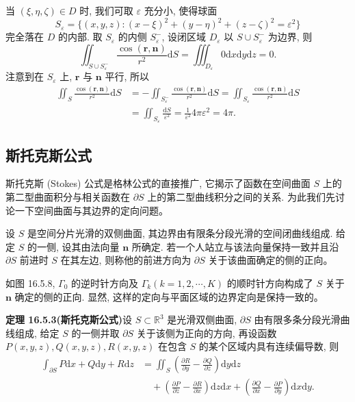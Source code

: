 \documentclass[UTF8, 12pt, fontset=fandol, oneside]{ctexart}
\begin{document}
当 $(\xi,\eta,\zeta)\in D$ 时, 我们可取 $\varepsilon$ 充分小, 使得球面
\[
  S_\varepsilon=\{(x,y,z):(x-\xi)^2+(y-\eta)^2+(z-\zeta)^2=\varepsilon^2\}
\]
完全落在 $D$ 的内部. 取 $S_\varepsilon$ 的内侧 $S_\varepsilon^-$, 设闭区域 $D_\varepsilon$ 以 $S\cup S_\varepsilon^-$ 为边界, 则
\[
  \iint_{S\cup S_\varepsilon^-}\frac{\cos(\boldsymbol r,\boldsymbol n)}{r^2}\mathrm dS
  =\iiint_{D_\varepsilon}0\mathrm dx\mathrm dy\mathrm dz=0.
\]
注意到在 $S_\varepsilon$ 上, $\boldsymbol r$ 与 $\boldsymbol n$ 平行, 所以
\[
\begin{aligned}
  \iint_S\frac{\cos(\boldsymbol r,\boldsymbol n)}{r^2}\mathrm dS
  &=-\iint_{S_\varepsilon^-}\frac{\cos(\boldsymbol r,\boldsymbol n)}{r^2}\mathrm dS
    =\iint_{S_\varepsilon}\frac{\cos(\boldsymbol r,\boldsymbol n)}{r^2}\mathrm dS\\
  &=\iint_{S_\varepsilon}\frac{\mathrm dS}{\varepsilon^2}
    =\frac1{\varepsilon^2}4\pi\varepsilon^2=4\pi.
\end{aligned}
\]

\subsection{斯托克斯公式}

斯托克斯 (Stokes) 公式是格林公式的直接推广, 它揭示了函数在空间曲面 $S$ 上的第二型曲面积分与相关函数在 $\partial S$ 上的第二型曲线积分之间的关系. 为此我们先讨论一下空间曲面与其边界的定向问题。

设 $S$ 是空间分片光滑的双侧曲面, 其边界由有限条分段光滑的空间闭曲线组成. 给定 $S$ 的一侧, 设其由法向量 $\boldsymbol n$ 所确定. 若一个人站立与该法向量保持一致并且沿 $\partial S$ 前进时 $S$ 在其左边, 则称他的前进方向为 $\partial S$ 关于该曲面确定的侧的正向。

如图 16.5.8, $\Gamma_0$ 的逆时针方向及 $\Gamma_k(k=1,2,\cdots,K)$ 的顺时针方向构成了 $S$ 关于 $\boldsymbol n$ 确定的侧的正向. 显然, 这样的定向与平面区域的边界定向是保持一致的。

\noindent\textbf{定理 16.5.3(斯托克斯公式)}\quad 设 $S\subset\mathbb R^3$ 是光滑双侧曲面, $\partial S$ 由有限多条分段光滑曲线组成, 给定 $S$ 的一侧并取 $\partial S$ 关于该侧为正向的方向, 再设函数 $P(x,y,z),Q(x,y,z),R(x,y,z)$ 在包含 $S$ 的某个区域内具有连续偏导数, 则
\[
\begin{aligned}
  \int_{\partial S}P\mathrm dx+Q\mathrm dy+R\mathrm dz
  &=\iint_S\left(\frac{\partial R}{\partial y}-\frac{\partial Q}{\partial z}\right)\mathrm dy\mathrm dz\\
  &\quad+\left(\frac{\partial P}{\partial z}-\frac{\partial R}{\partial x}\right)\mathrm dz\mathrm dx
    +\left(\frac{\partial Q}{\partial x}-\frac{\partial P}{\partial y}\right)\mathrm dx\mathrm dy.
\end{aligned}
\]
\end{document}
